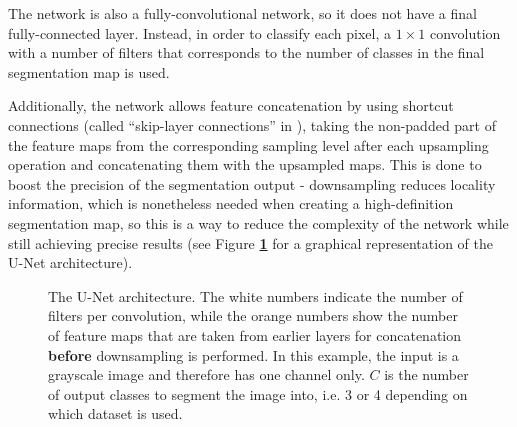 
The network is also a fully-convolutional network, so it does not have a final fully-connected layer. Instead, in order to classify each pixel, a $1 \times 1$ convolution with a number of filters that corresponds to the number of classes in the final segmentation map is used.

Additionally, the network allows feature concatenation by using shortcut connections (called ``skip-layer connections'' in \cite{bishop_pattern}), taking the non-padded part of the feature maps from the corresponding sampling level after each upsampling operation and concatenating them with the upsampled maps. This is done to boost the precision of the segmentation output - downsampling reduces locality information, which is nonetheless needed when creating a high-definition segmentation map, so this is a way to reduce the complexity of the network while still achieving precise results (see Figure \textbf{\ref{fig:unet_arch}} for a graphical representation of the U-Net architecture).\\

\begin {figure}[!htb]
	\scalebox{0.75}{}
	\caption[The U-Net architecture.]{The U-Net architecture. The white numbers indicate the number of filters per convolution, while the orange numbers show the number of feature maps that are taken from earlier layers for concatenation \textbf{before} downsampling is performed. In this example, the input is a grayscale image and therefore has one channel only. $C$ is the number of output classes to segment the image into, i.e. 3 or 4 depending on which dataset is used.}
	\label{fig:unet_arch}
\end {figure}
